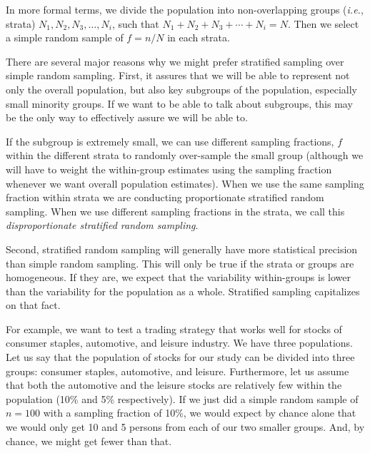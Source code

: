 In more formal terms, we divide the population into non-overlapping groups (\textit{i.e.}, strata) $N_1, N_2, N_3, \ldots, N_i$, such that $N_1 + N_2 + N_3 + \cdots + N_i = N$. Then we select a simple random sample of $f = n/N$ in each strata.

There are several major reasons why we might prefer stratified sampling over simple random sampling. First, it assures that we will be able to represent not only the overall population, but also key subgroups of the population, especially small minority groups. If we want to be able to talk about subgroups, this may be the only way to effectively assure we will be able to.

If the subgroup is extremely small, we can use different sampling fractions, $f$ within the different strata to randomly over-sample the small group (although we will have to weight the within-group estimates using the sampling fraction whenever we want overall population estimates). When we use the same sampling fraction within strata we are conducting proportionate stratified random sampling. When we use different sampling fractions in the strata, we call this \emph{disproportionate stratified random sampling}.

Second, stratified random sampling will generally have more statistical precision than simple random sampling. This will only be true if the strata or groups are homogeneous. If they are, we expect that the variability within-groups is lower than the variability for the population as a whole. Stratified sampling capitalizes on that fact.

For example, we want to test a trading strategy that works well for stocks of consumer staples, automotive, and leisure industry. We have three populations. Let us say that the population of stocks for our study can be divided into three groups: consumer staples, automotive, and leisure. Furthermore, let us assume that both the automotive and the leisure stocks are relatively few within the population (10\% and 5\% respectively). If we just did a simple random sample of $n=100$ with a sampling fraction of 10\%, we would expect by chance alone that we would only get 10 and 5 persons from each of our two smaller groups. And, by chance, we might get fewer than that.

